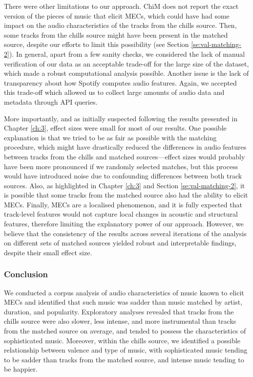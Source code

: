 There were other limitations to our approach. ChiM does not report the exact version of the pieces of music that elicit MECs, which could have had some impact on the audio characteristics of the tracks from the chills source. Then, some tracks from the chills source might have been present in the matched source, despite our efforts to limit this possibility (see Section \ref{se:val-matching-2}). In general, apart from a few sanity checks, we considered the lack of manual verification of our data as an acceptable trade-off for the large size of the dataset, which made a robust computational analysis possible. Another issue is the lack of transparency about how Spotify computes audio features. Again, we accepted this trade-off which allowed us to collect large amounts of audio data and metadata through API queries.

More importantly, and as initially suspected following the results presented in Chapter \ref{ch:3}, effect sizes were small for most of our results. One possible explanation is that we tried to be as fair as possible with the matching procedure, which might have drastically reduced the differences in audio features between tracks from the chills and matched sources---effect sizes would probably have been more pronounced if we randomly selected matches, but this process would have introduced noise due to confounding differences between both track sources. Also, as highlighted in Chapter \ref{ch:3} and Section \ref{se:val-matching-2}, it is possible that some tracks from the matched source also had the ability to elicit MECs. Finally, MECs are a localised phenomenon, and it is fully expected that track-level features would not capture local changes in acoustic and structural features, therefore limiting the explanatory power of our approach. However, we believe that the consistency of the results across several iterations of the analysis on different sets of matched sources yielded robust and interpretable findings, despite their small effect size.

\subsubsection{Conclusion}

We conducted a corpus analysis of audio characteristics of music known to elicit MECs and identified that such music was sadder than music matched by artist, duration, and popularity. Exploratory analyses revealed that tracks from the chills source were also slower, less intense, and more instrumental than tracks from the matched source on average, and tended to possess the characteristics of sophisticated music. Moreover, within the chills source, we identified a possible relationship between valence and type of music, with sophisticated music tending to be sadder than tracks from the matched source, and intense music tending to be happier. 

